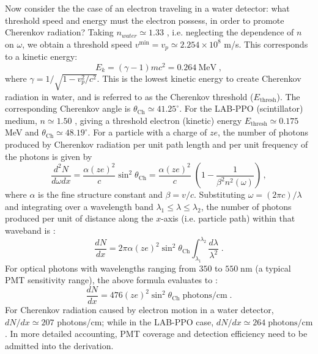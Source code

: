 Now consider the the case of an electron traveling in a water detector: what threshold speed and energy must the electron possess, in order to promote Cherenkov radiation? Taking $n_{water}\simeq 1.33$ \cite{pdg2020}, i.e. neglecting the dependence of $n$ on $\omega$, we obtain a threshold speed $v^{\mathrm{min}} = v_p \simeq 2.254\times10^8$ m/s. This corresponds to a kinetic energy:
\begin{equation*}
E_k=(\gamma-1)mc^2=0.264~\mathrm{MeV}\;,
\end{equation*}
where $\gamma=1/\sqrt{1-v_p^2/c^2}$. This is the lowest kinetic energy to create Cherenkov radiation in water, and is referred to as the Cherenkov threshold ($E_{\mathrm{thresh}}$). The corresponding Cherenkov angle is $\theta_\mathrm{Ch}\simeq 41.25^\circ$. For the LAB-PPO (scintillator) medium, $n\simeq 1.50$ \cite{tseung2011ellipsometric}, giving a threshold electron (kinetic) energy $E_{\mathrm{thresh}}\simeq 0.175$ MeV and $\theta_\mathrm{Ch}\simeq 48.19^\circ$.
For a particle with a charge of $ze$, the number of photons produced by Cherenkov radiation per unit path length and per unit frequency of the photons is given by \cite{leo2012techniques}
\begin{equation}
\frac{d^2N}{d\omega dx}=\frac{\alpha (ze)^2}{c}\sin^2\theta_\mathrm{Ch}=\frac{\alpha (ze)^2}{c} \; \left(1-\frac{1}{\beta^2 n^2(\omega)} \right) \, ,
\end{equation}
where $\alpha$ is the fine structure constant and $\beta=v/c$. Substituting $\omega= (2\pi c)/\lambda$ and integrating over a wavelength band $\lambda_1 \le \lambda \le \lambda_2$, the number of photons produced per unit of distance along the $x$-axis (i.e. particle path) within that waveband is \cite{leo2012techniques}:
\begin{equation}
\frac{dN}{dx}=2\pi \alpha (ze)^2\sin^2\theta_\mathrm{Ch}\int_{\lambda_1}^{\lambda_2}\frac{d\lambda}{\lambda^2} \; .
\end{equation}
For optical photons with wavelengths ranging from $350$ to $550 \; \mathrm{nm}$ (a typical PMT sensitivity range), the above formula evaluates to \cite{leo2012techniques}:
\begin{equation}
\frac{dN}{dx}=476(ze)^2\sin^2\theta_\mathrm{Ch} \; \mathrm{photons/cm}\;.
\end{equation}
For Cherenkov radiation caused by electron motion in a water detector, $dN/dx \simeq 207$ photons/cm; while in the LAB-PPO case, $dN/dx \simeq 264 \; \mathrm{photons/cm}$. In more detailed accounting, PMT coverage and detection efficiency need to be admitted into the derivation.

